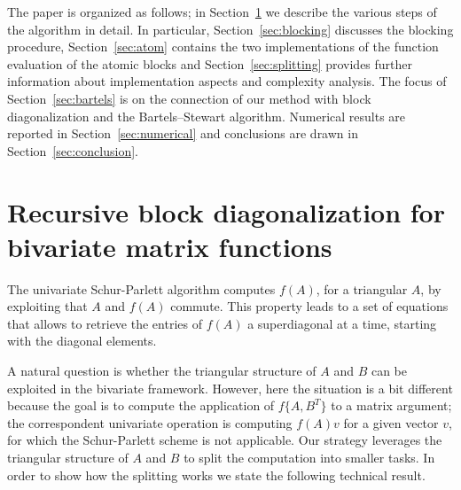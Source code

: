 \documentclass{siamart1116}
\begin{document}
The paper is organized as follows; in Section~\ref{sec:main} 
we describe the various steps of the algorithm in detail. 
In particular, Section~\ref{sec:blocking} discusses the blocking
procedure, Section~\ref{sec:atom} contains the two 
implementations of the function evaluation of the atomic 
blocks and Section~\ref{sec:splitting} provides further 
information about implementation aspects and complexity 
analysis. The focus of Section~\ref{sec:bartels} is on the connection of our method
with block diagonalization and the Bartels--Stewart 
algorithm. Numerical results are reported in 
Section~\ref{sec:numerical} and  conclusions are 
drawn in Section~\ref{sec:conclusion}.

\section{Recursive block diagonalization for bivariate matrix
functions}\label{sec:main}
The univariate Schur-Parlett algorithm computes $f(A)$, 
for a triangular $A$, by exploiting that $A$ and $f(A)$ 
commute. This property leads to a set of equations that allows
to retrieve the entries of $f(A)$ a
superdiagonal at a time, starting with the diagonal elements.

A natural question is whether the triangular structure 
of $A$ and $B$ can be exploited in the bivariate framework. 
However, here the situation is a bit different because 
the goal is to compute the application of $f\{A,B^T\}$ 
to  a matrix argument; the correspondent univariate operation is computing 
$f(A)v$ for a given vector $v$, for which the
Schur-Parlett scheme is not applicable.
Our strategy leverages the triangular structure 
of $A$ and $B$ to split the computation into smaller 
tasks. In order to show how the splitting works we state the
following technical result.
\end{document}
